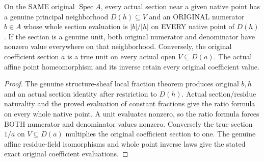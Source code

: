 \begin{lemma}
\label{scheme:actual-affine-unit-fractions}
\leanok
On the SAME original $\operatorname{Spec}A$, every actual section near a given
native point has a genuine principal neighborhood $D(h)\subseteq V$ and an
ORIGINAL numerator $b\in A$ whose whole section evaluation is $|b|/|h|$ on
EVERY native point of $D(h)$. If the section is a genuine unit, both original
numerator and denominator have nonzero value everywhere on that neighborhood.
Conversely, the original coefficient section $a$ is a true unit on every actual
open $V\subseteq D(a)$. The actual affine point homeomorphism and its inverse
retain every original coefficient value.
\end{lemma}
\begin{proof}
The genuine structure-sheaf local fraction theorem produces original $b,h$ and
an actual section identity after restriction to $D(h)$. Actual section/residue
naturality and the proved evaluation of constant fractions give the ratio
formula on every whole native point. A unit evaluates nonzero, so the ratio
formula forces BOTH numerator and denominator values nonzero. Conversely the
true section $1/a$ on $V\subseteq D(a)$ multiplies the original coefficient
section to one. The genuine affine residue-field isomorphisms and whole point
inverse laws give the stated exact original coefficient evaluations.
\end{proof}

